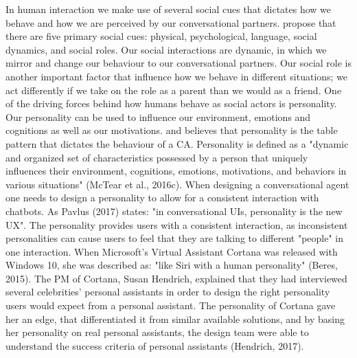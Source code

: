 In human interaction we make use of several social cues that dictates how we behave and how we are perceived by our conversational partners. \cite{Fogg2002} propose that there are five primary social cues: physical, psychological, language, social dynamics, and social roles. Our social interactions are dynamic, in which we mirror and change our behaviour to our conversational partners. Our social role is another important factor that influence how we behave in different situations; we act differently if we take on the role as a parent than we would as a friend. One of the driving forces behind how humans behave as social actors is personality. Our personality can be used to influence our environment, emotions and cognitions as well as our motivations. \cite{callejas2011} and \cite{Xiao2005} believes that personality is the table pattern that dictates the behaviour of a CA. Personality is defined as a "dynamic and organized set of characteristics possessed by a person that uniquely influences their environment, cognitions, emotions, motivations, and behaviors in various situations" \citep{McTear2016b} (McTear et al., 2016c). When designing a conversational agent one needs to design a personality to allow for a consistent interaction with chatbots. As Pavlus (2017) states: "in conversational UIs, personality is the new UX". The personality provides users with a consistent interaction, as inconsistent personalities can cause users to feel that they are talking to different "people" in one interaction. When Microsoft's Virtual Assistant Cortana was released with Windows 10, she was described as: "like Siri with a human personality" (Beres, 2015). The PM of Cortana, Susan Hendrich, explained that they had interviewed several celebrities' personal assistants in order to design the right personality users would expect from a personal assistant. The personality of Cortana gave her an edge, that differentiated it from similar available solutions, and by basing her personality on real personal assistants, the design team were able to understand the success criteria of personal assistants (Hendrich, 2017).

